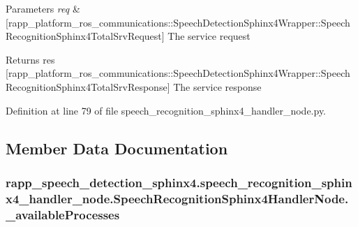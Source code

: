 \begin{DoxyParams}{Parameters}
{\em req} & \mbox{[}rapp\-\_\-platform\-\_\-ros\-\_\-communications\-::\-Speech\-Detection\-Sphinx4\-Wrapper\-::\-Speech\-Recognition\-Sphinx4\-Total\-Srv\-Request\mbox{]} The service request \\
\hline
\end{DoxyParams}
\begin{DoxyReturn}{Returns}
res \mbox{[}rapp\-\_\-platform\-\_\-ros\-\_\-communications\-::\-Speech\-Detection\-Sphinx4\-Wrapper\-::\-Speech\-Recognition\-Sphinx4\-Total\-Srv\-Response\mbox{]} The service response 
\end{DoxyReturn}


Definition at line 79 of file speech\-\_\-recognition\-\_\-sphinx4\-\_\-handler\-\_\-node.\-py.



\subsection{Member Data Documentation}
\hypertarget{classrapp__speech__detection__sphinx4_1_1speech__recognition__sphinx4__handler__node_1_1SpeechRecognitionSphinx4HandlerNode_a528ab714ddc50a375936f09d62ec2a8a}{
\subsubsection[{\-\_\-available\-Processes}]{\setlength{\rightskip}{0pt plus 5cm}rapp\-\_\-speech\-\_\-detection\-\_\-sphinx4.\-speech\-\_\-recognition\-\_\-sphinx4\-\_\-handler\-\_\-node.\-Speech\-Recognition\-Sphinx4\-Handler\-Node.\-\_\-available\-Processes\hspace{0.3cm}{\ttfamily [private]}}}\label{classrapp__speech__detection__sphinx4_1_1speech__recognition__sphinx4__handler__node_1_1SpeechRecognitionSphinx4HandlerNode_a528ab714ddc50a375936f09d62ec2a8a}



